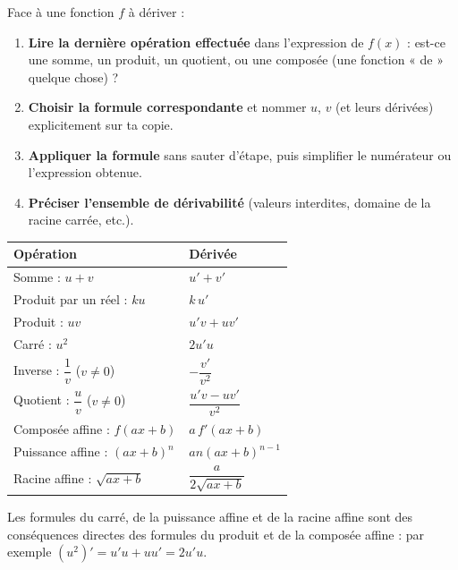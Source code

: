 \documentclass[11pt]{article}
\begin{document}
\begin{methode}
Face à une fonction $f$ à dériver :
\begin{enumerate}
\item \textbf{Lire la dernière opération effectuée} dans l'expression de $f(x)$ : est-ce une somme, un produit, un quotient, ou une composée (une fonction « de » quelque chose) ?
\item \textbf{Choisir la formule correspondante} et nommer $u$, $v$ (et leurs dérivées) explicitement sur ta copie.
\item \textbf{Appliquer la formule} sans sauter d'étape, puis simplifier le numérateur ou l'expression obtenue.
\item \textbf{Préciser l'ensemble de dérivabilité} (valeurs interdites, domaine de la racine carrée, etc.).
\end{enumerate}
\end{methode}

\begin{aretenir}
\begin{center}
\begin{tabularx}{\linewidth}{|l|X|}
\hline
\rowcolor{popblueL} \textbf{Opération} & \textbf{Dérivée} \\
\hline
Somme : $u+v$ & $u'+v'$ \\
\hline
Produit par un réel : $ku$ & $k\,u'$ \\
\hline
Produit : $uv$ & $u'v + uv'$ \\
\hline
Carré : $u^2$ & $2u'u$ \\
\hline
Inverse : $\dfrac{1}{v}$ \; ($v\neq 0$) & $-\dfrac{v'}{v^2}$ \\
\hline
Quotient : $\dfrac{u}{v}$ \; ($v\neq 0$) & $\dfrac{u'v - uv'}{v^2}$ \\
\hline
Composée affine : $f(ax+b)$ & $a\,f'(ax+b)$ \\
\hline
Puissance affine : $(ax+b)^n$ & $an(ax+b)^{n-1}$ \\
\hline
Racine affine : $\sqrt{ax+b}$ & $\dfrac{a}{2\sqrt{ax+b}}$ \\
\hline
\end{tabularx}
\end{center}
Les formules du carré, de la puissance affine et de la racine affine sont des conséquences directes des formules du produit et de la composée affine : par exemple $(u^2)' = u'u + uu' = 2u'u$.
\end{aretenir}
\end{document}
